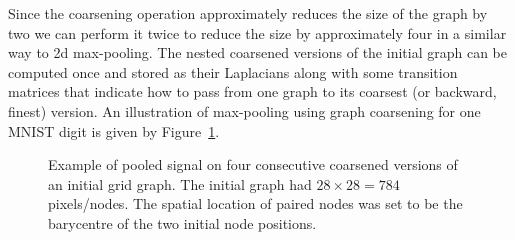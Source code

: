 Since the coarsening operation approximately reduces the size of the graph by two we can perform it twice to reduce the size by approximately four in a similar way to 2d max-pooling. The nested coarsened versions of the initial graph can be computed once and stored as their Laplacians along with some transition matrices that indicate how to pass from one graph to its coarsest (or backward, finest) version. An illustration of max-pooling using graph coarsening for one MNIST digit is given by Figure~\ref{fig:coarsening}.

\begin{figure}
    \centering
    \caption{Example of pooled signal on four consecutive coarsened versions of an initial grid graph. The initial graph had $28\times28=784$ pixels/nodes. The spatial location of paired nodes was set to be the barycentre of the two initial node positions.}
    \label{fig:coarsening}
\end{figure}

